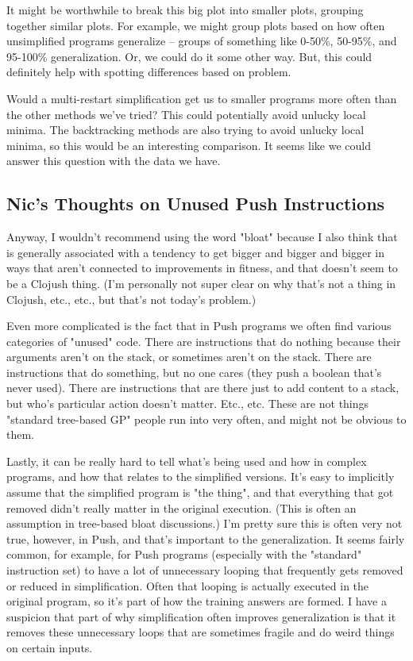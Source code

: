     It might be worthwhile to break this big plot into smaller plots, grouping together similar plots. For example, we might group plots based on how often unsimplified programs generalize -- groups of something like 0-50\%, 50-95\%, and 95-100\% generalization. Or, we could do it some other way. But, this could definitely help with spotting differences based on problem.

    Would a multi-restart simplification get us to smaller programs more often than the other methods we've tried? This could potentially avoid unlucky local minima. The backtracking methods are also trying to avoid unlucky local minima, so this would be an interesting comparison. It seems like we could answer this question with the data we have.

\subsection{Nic's Thoughts on Unused Push Instructions}
Anyway, I wouldn't recommend using the word "bloat" because I also think that is generally associated with a tendency to get bigger and bigger and bigger in ways that aren't connected to improvements in fitness, and that doesn't seem to be a Clojush thing. (I'm personally not super clear on why that's not a thing in Clojush, etc., etc., but that's not today's problem.)

Even more complicated is the fact that in Push programs we often find various categories of "unused" code. There are instructions that do nothing because their arguments aren't on the stack, or sometimes aren't on the stack. There are instructions that do something, but no one cares (they push a boolean that's never used). There are instructions that are there just to add content to a stack, but who's particular action doesn't matter. Etc., etc. These are not things "standard tree-based GP" people run into very often, and might not be obvious to them.

Lastly, it can be really hard to tell what's being used and how in complex programs, and how that relates to the simplified versions. It's easy to implicitly assume that the simplified program is "the thing", and that everything that got removed didn't really matter in the original execution. (This is often an assumption in tree-based bloat discussions.) I'm pretty sure this is often very not true, however, in Push, and that's important to the generalization. It seems fairly common, for example, for Push programs (especially with the "standard" instruction set) to have a lot of unnecessary looping that frequently gets removed or reduced in simplification. Often that looping is actually executed in the original program, so it's part of how the training answers are formed. I have a suspicion that part of why simplification often improves generalization is that it removes these unnecessary loops that are sometimes fragile and do weird things on certain inputs.



